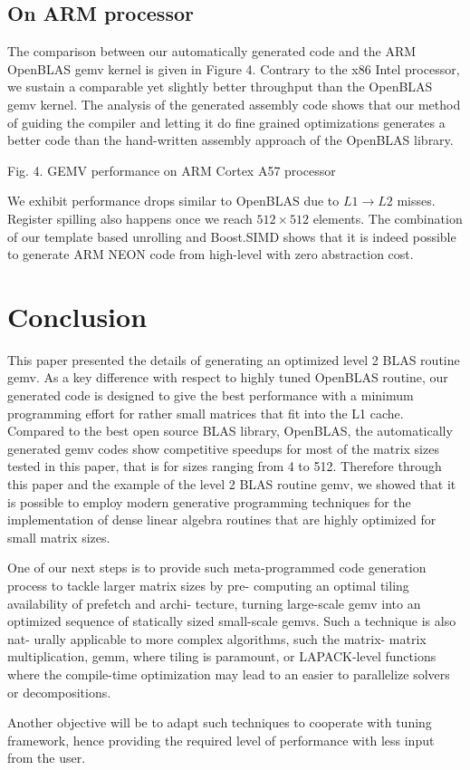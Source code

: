 \documentclass[../../main.tex]{subfiles}
\begin{document}
\subsection{On ARM processor}

The comparison between our automatically generated code
and the ARM OpenBLAS gemv kernel is given in Figure 4.
Contrary to the x86 Intel processor, we sustain a comparable
yet slightly better throughput than the OpenBLAS gemv
kernel. The analysis of the generated assembly code shows
that our method of guiding the compiler and letting it do
fine grained optimizations generates a better code than the
hand-written assembly approach of the OpenBLAS library.

Fig. 4. GEMV performance on ARM Cortex A57 processor

We exhibit performance drops similar to OpenBLAS due to
$L1 \rightarrow L2$ misses. Register spilling also happens once we reach
$512 \times 512$ elements. The combination of our template based
unrolling and Boost.SIMD shows that it is indeed possible to
generate ARM NEON code from high-level \cpp with zero
abstraction cost.

\section{Conclusion}

This paper presented the details of generating an optimized
level 2 BLAS routine gemv. As a key difference with respect
to highly tuned OpenBLAS routine, our generated code
is designed to give the best performance with a minimum
programming effort for rather small matrices that fit into the
L1 cache. Compared to the best open source BLAS library,
OpenBLAS, the automatically generated gemv codes show
competitive speedups for most of the matrix sizes tested in
this paper, that is for sizes ranging from 4 to 512. Therefore
through this paper and the example of the level 2 BLAS
routine gemv, we showed that it is possible to employ modern
generative programming techniques for the implementation
of dense linear algebra routines that are highly optimized for
small matrix sizes.

One of our next steps is to provide such meta-programmed
code generation process to tackle larger matrix sizes by pre-
computing an optimal tiling availability of prefetch and archi-
tecture, turning large-scale gemv into an optimized sequence of
statically sized small-scale gemvs. Such a technique is also nat-
urally applicable to more complex algorithms, such the matrix-
matrix multiplication, gemm, where tiling is paramount, or
LAPACK-level functions where the compile-time optimization
may lead to an easier to parallelize solvers or decompositions.

Another objective will be to adapt such techniques to cooperate
with tuning framework, hence providing the required level of
performance with less input from the user.
\end{document}
